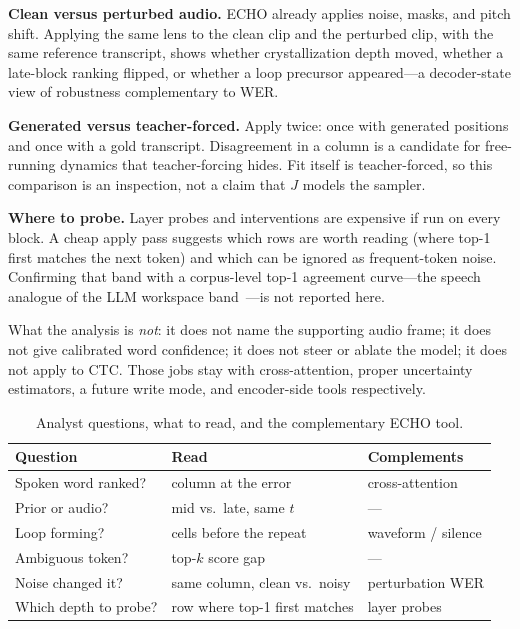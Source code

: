 \documentclass[conference]{IEEEtran}
\begin{document}
\textbf{Clean versus perturbed audio.}
ECHO already applies noise, masks, and pitch shift. Applying the same lens to the clean clip and the perturbed clip, with the same reference transcript, shows whether crystallization depth moved, whether a late-block ranking flipped, or whether a loop precursor appeared---a decoder-state view of robustness complementary to WER.

\textbf{Generated versus teacher-forced.}
Apply twice: once with generated positions and once with a gold transcript. Disagreement in a column is a candidate for free-running dynamics that teacher-forcing hides. Fit itself is teacher-forced, so this comparison is an inspection, not a claim that \(J\) models the sampler.

\textbf{Where to probe.}
Layer probes and interventions are expensive if run on every block. A cheap apply pass suggests which rows are worth reading (where top-1 first matches the next token) and which can be ignored as frequent-token noise. Confirming that band with a corpus-level top-1 agreement curve---the speech analogue of the LLM workspace band~\cite{gurnee2026workspace}---is not reported here.

What the analysis is \emph{not}: it does not name the supporting audio frame; it does not give calibrated word confidence; it does not steer or ablate the model; it does not apply to CTC. Those jobs stay with cross-attention, proper uncertainty estimators, a future write mode, and encoder-side tools respectively.

\begin{table}[!t]
\caption{Analyst questions, what to read, and the complementary ECHO tool.}
\label{tab:use}
\centering
\setlength{\tabcolsep}{2.5pt}
\begin{tabular}{@{}p{}p{}p{}@{}}
\toprule
Question & Read & Complements \\
\midrule
Spoken word ranked? & column at the error & cross-attention \\
Prior or audio? & mid vs.\ late, same \(t\) & --- \\
Loop forming? & cells before the repeat & waveform / silence \\
Ambiguous token? & top-\(k\) score gap & --- \\
Noise changed it? & same column, clean vs.\ noisy & perturbation WER \\
Which depth to probe? & row where top-1 first matches & layer probes \\
\bottomrule
\end{tabular}
\end{table}
\end{document}
